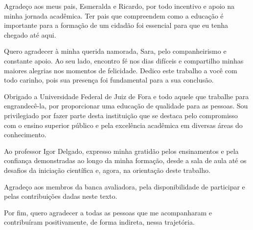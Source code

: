 \begin{agradecimentos}

Agradeço aos meus pais, Esmeralda e Ricardo, por todo incentivo e apoio na minha jornada acadêmica. Ter pais que compreendem como a educação é importante para a formação de um cidadão foi essencial para que eu tenha chegado até aqui.


Quero agradecer à minha querida namorada, Sara, pelo companheirismo e constante apoio. Ao seu lado, encontro fé nos dias difíceis e compartilho minhas maiores alegrias nos momentos de felicidade. Dedico este trabalho a você com todo carinho, pois sua presença foi fundamental para a sua conclusão.

Obrigado a Universidade Federal de Juiz de Fora e todo aquele que trabalhe para engrandecê-la, por proporcionar uma educação de qualidade para as pessoas. Sou privilegiado por fazer parte desta instituição que se destaca pelo compromisso com o ensino superior público e pela excelência acadêmica em diversas áreas do conhecimento.

Ao professor Igor Delgado, expresso minha gratidão pelos ensinamentos e pela confiança demonstradas ao longo da minha formação, desde a sala de aula até os desafios da iniciação científica e, agora, na orientação deste trabalho.

Agradeço aos membros da banca avaliadora, pela disponibilidade de participar e pelas contribuições dadas neste texto.

Por fim, quero agradecer a todas as pessoas que me acompanharam e contribuíram positivamente, de forma indireta, nessa trajetória.

\end{agradecimentos}